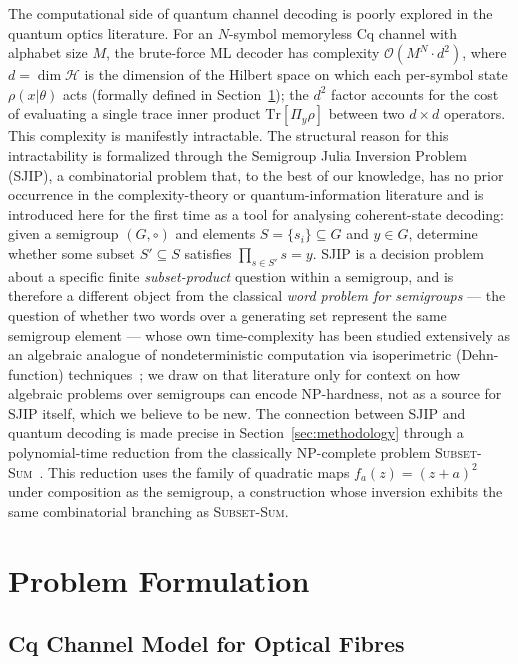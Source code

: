 \documentclass[journal,twocolumn]{IEEEtran}
\theoremstyle{definition}
\theoremstyle{plain}
\newcommand{\calH}{\mathcal{H}}
\newcommand{\Tr}{\mathrm{Tr}}
\begin{document}
The computational side of quantum channel decoding is poorly
explored in the quantum optics literature.  For an $N$-symbol
memoryless Cq channel with alphabet size $M$, the brute-force ML
decoder has complexity $\mathcal{O}(M^N \cdot d^2)$, where $d =
\dim\calH$ is the dimension of the Hilbert space on which each
per-symbol state $\rho(x|\theta)$ acts (formally defined in
Section~\ref{sec:problem}); the $d^2$ factor accounts for the cost of
evaluating a single trace inner product $\Tr[\Pi_y\rho]$ between two
$d\times d$ operators. This complexity is manifestly intractable.  The structural reason for this intractability
is formalized through the Semigroup Julia Inversion Problem (SJIP),
a combinatorial problem that, to the best of our knowledge, has no
prior occurrence in the complexity-theory or quantum-information
literature and is introduced here for the first time as a tool for
analysing coherent-state decoding: given a semigroup $(G,\circ)$ and
elements $S = \{s_i\} \subseteq G$
and $y \in G$, determine whether some subset $S' \subseteq S$
satisfies $\prod_{s \in S'} s = y$.  SJIP is a decision problem about
a specific finite \emph{subset-product} question within a semigroup,
and is therefore a different object from the classical
\emph{word problem for semigroups} --- the question of whether two
words over a generating set represent the same semigroup element ---
whose own time-complexity has been studied extensively as an
algebraic analogue of nondeterministic computation via isoperimetric
(Dehn-function) techniques~\cite{birget1998}; we draw on that
literature only for context on how algebraic problems over semigroups
can encode NP-hardness, not as a source for SJIP itself, which we
believe to be new. The connection between SJIP
and quantum decoding is made precise in Section~\ref{sec:methodology}
through a polynomial-time reduction from the classically NP-complete
problem \textsc{Subset-Sum}~\cite{garey1979}.  This reduction uses
the family of quadratic maps $f_a(z) = (z+a)^2$ under composition
as the semigroup, a construction whose inversion exhibits the same
combinatorial branching as \textsc{Subset-Sum}.

\section{Problem Formulation}
\label{sec:problem}

\subsection{Cq Channel Model for Optical Fibres}
\end{document}
